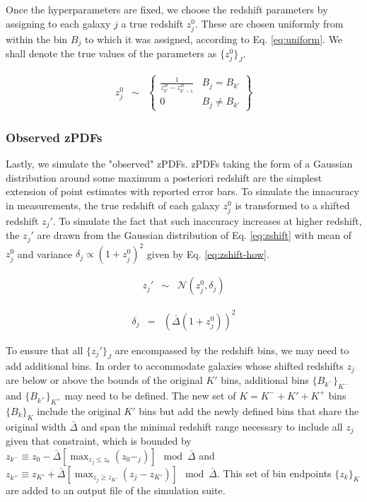 \documentclass[preprint]{aastex}
\begin{document}
Once the hyperparameters are fixed, we choose the redshift parameters by assigning to each galaxy $j$ a true redshift $z_{j}^{0}$.  These are chosen uniformly from within the bin $B_{j}$ to which it was assigned, according to Eq. \ref{eq:uniform}.  We shall denote the true values of the parameters as $\{z_{j}^{0}\}_{J}$. 

\begin{eqnarray}
\label{eq:uniform}
z_{j}^{0} &\sim& \left\{\begin{array}{cc}\frac{1}{z^{B}_{k'}-z^{B}_{k'-1}} & B_{j} = B_{k'}\\0 & B_{j} \neq B_{k'}\end{array}\right\}
\end{eqnarray}

\clearpage
\subsubsection{Observed zPDFs}
\label{sec:d}

Lastly, we simulate the "observed" zPDFs.  zPDFs taking the form of a Gaussian distribution around some maximum a posteriori redshift are the simplest extension of point estimates with reported error bars.  To simulate the innacuracy in measurements, the true redshift of each galaxy $z_{j}^{0}$ is transformed to a shifted redshift $z_{j}'$.  To simulate the fact that such inaccuracy increases at higher redshift, the $z_{j}'$ are drawn from the Gaussian distribution of Eq. \ref{eq:zshift} with mean of $z_{j}^{0}$ and variance $\delta_{j}\propto(1+z_{j}^{0})^{2}$ given by Eq. \ref{eq:zshift-how}.  

\begin{eqnarray}
\label{eq:zshift}
z_{j}' &\sim& \mathcal{N}(z_{j}^{0},\delta_{j})
\end{eqnarray}

\begin{eqnarray}
\label{eq:zshift-how}
\delta_{j} &=& (\bar{\Delta}(1+z^{0}_{j}))^{2}
\end{eqnarray}

To ensure that all $\{z_{j}'\}_{J}$ are encompassed by the redshift bins, we may need to add additional bins.  In order to accommodate galaxies whose shifted redshifts $z_{j}$ are below or above the bounds of the original $K'$ bins, additional bins $\{B_{k^{-}}\}_{K^{-}}$ and $\{B_{k^{+}}\}_{K^{+}}$ may need to be defined.  The new set of $K=K^{-}+K'+K^{+}$ bins $\{B_{k}\}_{K}$ include the original $K'$ bins but add the newly defined bins that share the original width $\bar{\Delta}$ and span the minimal redshift range necessary to include all $z_{j}$ given that constraint, which is bounded by $z_{k^{-}}\equiv z_{0}-\bar{\Delta}[\max_{z_{j}\leq z_{0}}(z_{0}-_{j})]\mod\bar{\Delta}$ and $z_{k^{+}}\equiv z_{K'}+\bar{\Delta}[\max_{z_{j}\geq z_{K'}}(z_{j}-z_{K'})]\mod\bar{\Delta}$.  This set of bin endpoints $\{z_{k}\}_{K}$ are added to an output file of the simulation suite.
\end{document}
